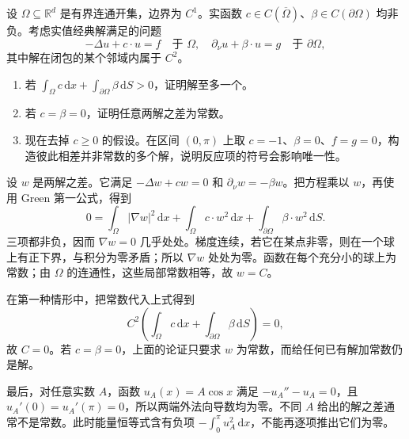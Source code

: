 \begin{optionalexercise}\label{b2:ex:01-robin-energy}
设 \(\Omega\subseteq\mathbb R^d\) 是有界连通开集，边界为 \(C^1\)。实函数 \(c\in C(\overline\Omega)\)、\(\beta\in C(\partial\Omega)\) 均非负。考虑实值经典解满足的问题
\[
 -\Delta u+c\cdot u=f\quad\text{于 }\Omega,\quad
 \partial_\nu u+\beta\cdot u=g\quad\text{于 }\partial\Omega,
\]
其中解在闭包的某个邻域内属于 \(C^2\)。
\begin{enumerate}
 \item\label{b2:item:01-robin-positive} 若 \(\int_\Omega c\,\mathrm dx+\int_{\partial\Omega}\beta\,\mathrm dS>0\)，证明解至多一个。
 \item\label{b2:item:01-robin-zero} 若 \(c=\beta=0\)，证明任意两解之差为常数。
 \item\label{b2:item:01-robin-negative} 现在去掉 \(c\geq0\) 的假设。在区间 \((0,\pi)\) 上取 \(c=-1\)、\(\beta=0\)、\(f=g=0\)，构造彼此相差并非常数的多个解，说明反应项的符号会影响唯一性。
\end{enumerate}
\end{optionalexercise}
\begin{solution}
设 \(w\) 是两解之差。它满足 \(-\Delta w+cw=0\) 和 \(\partial_\nu w=-\beta w\)。把方程乘以 \(w\)，再使用 Green 第一公式，得到
\[
 0=\int_\Omega|\nabla w|^2\,\mathrm dx
 +\int_\Omega c\cdot w^2\,\mathrm dx
 +\int_{\partial\Omega}\beta\cdot w^2\,\mathrm dS.
\]
三项都非负，因而 \(\nabla w=0\) 几乎处处。梯度连续，若它在某点非零，则在一个球上有正下界，与积分为零矛盾；所以 \(\nabla w\) 处处为零。函数在每个充分小的球上为常数；由 \(\Omega\) 的连通性，这些局部常数相等，故 \(w=C\)。

在第一种情形中，把常数代入上式得到
\[
 C^2\left(\int_\Omega c\,\mathrm dx+
 \int_{\partial\Omega}\beta\,\mathrm dS\right)=0,
\]
故 \(C=0\)。若 \(c=\beta=0\)，上面的论证只要求 \(w\) 为常数，而给任何已有解加常数仍是解。

最后，对任意实数 \(A\)，函数 \(u_A(x)=A\cos x\) 满足 \(-u_A''-u_A=0\)，且 \(u_A'(0)=u_A'(\pi)=0\)，所以两端外法向导数均为零。不同 \(A\) 给出的解之差通常不是常数。此时能量恒等式含有负项 \(-\int_0^\pi u_A^2\,\mathrm dx\)，不能再逐项推出它们为零。
\end{solution}

